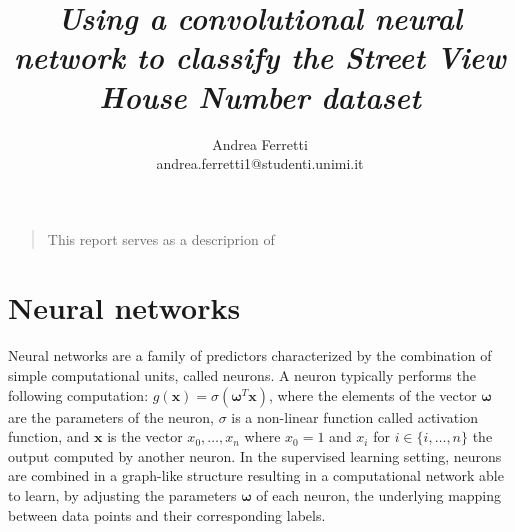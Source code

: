 \documentclass[12pt]{article}
\title{{\it Using a convolutional neural network to classify the Street View House Number dataset}}
\author
{Andrea Ferretti\\
\normalsize{andrea.ferretti1@studenti.unimi.it}
}
\date{}
\newenvironment{sciabstract}{%
\begin{quote} \bf}
{\end{quote}}
\newcommand{\vect}[1]{\boldsymbol{#1}}
\begin{document}
 


\baselineskip24pt


\maketitle 

\begin{sciabstract}

This report serves as a descriprion of 

\end{sciabstract}

\section*{Neural networks}
Neural networks are a family of predictors characterized by the combination of simple computational units, called neurons.
A neuron typically performs the following computation: $ g(\vect{x}) = \sigma(\vect{\omega}^T \vect{x}) $, where the elements of the vector $\vect{\omega}$ are the parameters of the neuron, $\sigma$ is a non-linear function called activation function, and $\vect{x}$ is the vector $x_0,\ldots,x_n $ where $ x_0 = 1$ and $x_i$ for $i \in \{i,\ldots,n\}$  the output computed by another neuron.
In the supervised learning setting, neurons are combined in a graph-like structure resulting in a computational network able to learn, by adjusting the parameters $\vect{\omega}$ of each neuron, the underlying mapping between data points and their corresponding labels.
\end{document}
